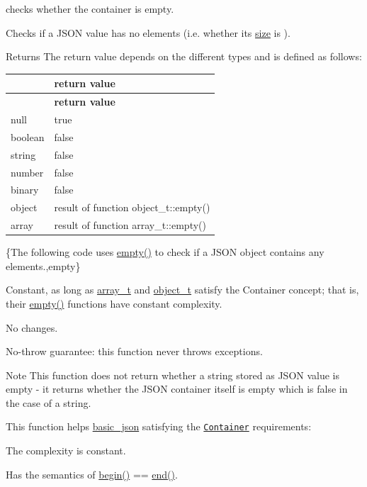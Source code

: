 checks whether the container is empty. 

Checks if a J\+S\+ON value has no elements (i.\+e. whether its \hyperlink{classnlohmann_1_1basic__json_a33c7c8638bb0b12e6d1b69d8106dd2e0}{size} is {}).

\begin{DoxyReturn}{Returns}
The return value depends on the different types and is defined as follows\+: \tabulinesep=1mm
\begin{longtabu} spread 0pt [c]{*2{|X[-1]}|}
\hline
{}&{\bf return value  }\\
\endfirsthead
\hline
\endfoot
\hline
{}&{\bf return value  }\\
\endhead
null &{\ttfamily true} \\
boolean &{\ttfamily false} \\
string &{\ttfamily false} \\
number &{\ttfamily false} \\
binary &{\ttfamily false} \\
object &result of function {\ttfamily object\+\_\+t\+::empty()} \\
array &result of function {\ttfamily array\+\_\+t\+::empty()} \\
\end{longtabu}
\{The following code uses {\ttfamily \hyperlink{classnlohmann_1_1basic__json_a5c99855f3e35ff35558cb46139b785f8}{empty()}} to check if a J\+S\+ON object contains any elements.,empty\}
\end{DoxyReturn}
Constant, as long as \hyperlink{classnlohmann_1_1basic__json_a53700c308d804f84aea5ff05abb2ac4e}{array\+\_\+t} and \hyperlink{classnlohmann_1_1basic__json_a5e3df077f880583a96d74cd63e173cb2}{object\+\_\+t} satisfy the Container concept; that is, their {\ttfamily \hyperlink{classnlohmann_1_1basic__json_a5c99855f3e35ff35558cb46139b785f8}{empty()}} functions have constant complexity.

No changes.

No-\/throw guarantee\+: this function never throws exceptions.

\begin{DoxyNote}{Note}
This function does not return whether a string stored as J\+S\+ON value is empty -\/ it returns whether the J\+S\+ON container itself is empty which is false in the case of a string.
\end{DoxyNote}
This function helps {\ttfamily \hyperlink{classnlohmann_1_1basic__json}{basic\+\_\+json}} satisfying the \href{https://en.cppreference.com/w/cpp/named_req/Container}{\tt Container} requirements\+:
\begin{DoxyItemize}
\item The complexity is constant.
\item Has the semantics of {\ttfamily \hyperlink{classnlohmann_1_1basic__json_a23b495b4c282e4afacf382f5b49af7c7}{begin()} == \hyperlink{classnlohmann_1_1basic__json_a931267ec3f09eb67e4382f321b2c52bc}{end()}}.
\end{DoxyItemize}

